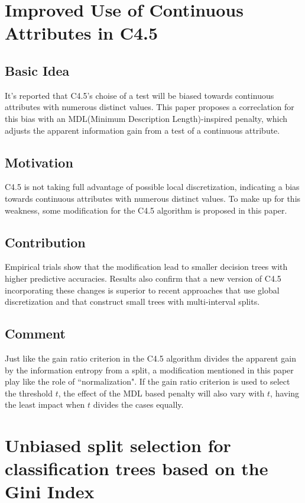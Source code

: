 \documentclass[a4paper]{article}
\begin{document}
    \section{Improved Use of Continuous Attributes in C4.5}
        \subsection{Basic Idea}
        It's reported that C4.5's choise of a test will be biased towards continuous attributes with numerous distinct values. This paper proposes a correclation for this bias with an MDL(Minimum Description Length)-inspired penalty, which adjusts the apparent information gain from a test of a continuous attribute.

        \subsection{Motivation}
        C4.5 is not taking full advantage of possible local discretization, indicating a bias towards continuous attributes with numerous distinct values. To make up for this weakness, some modification for the C4.5 algorithm is proposed in this paper.

        \subsection{Contribution}
        Empirical trials show that the modification lead to smaller decision trees with higher predictive accuracies. Results also confirm that a new version of C4.5 incorporating these changes is superior to recent approaches that use global discretization and that construct small trees with multi-interval splits.

        \subsection{Comment}
        Just like the gain ratio criterion in the C4.5 algorithm divides the apparent gain by the information entropy from a split, a modification mentioned in this paper play like the role of ``normalization". If the gain ratio criterion is used to select the threshold $ t $, the effect of the MDL based penalty will also vary with $ t $, having the least impact when $ t $ divides the cases equally.

    \section{Unbiased split selection for classification trees based on the Gini Index}
\end{document}
